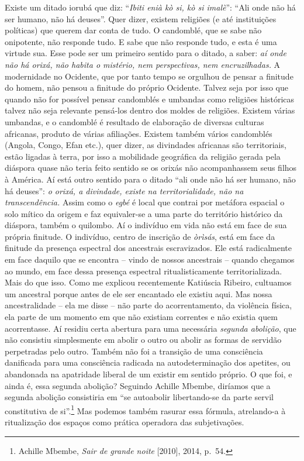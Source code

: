 Existe um ditado iorubá que diz: ``\emph{Ibiti enià kò si, kò si
imalè}'': ``Ali onde não há ser humano, não há deuses''. Quer dizer,
existem religiões (e até instituições políticas) que querem dar conta de
tudo. O candomblé, que se sabe não onipotente, não responde tudo. E sabe
que não responde tudo, e esta é uma virtude sua. Esse pode ser um
primeiro sentido para o ditado, a saber: \emph{aí onde não há orixá, não
habita o mistério, nem perspectivas, nem encruzilhadas.} A modernidade
no Ocidente, que por tanto tempo se orgulhou de pensar a finitude do
homem, não pensou a finitude do próprio Ocidente. Talvez seja por isso
que quando não for possível pensar candomblés e umbandas como religiões
históricas talvez não seja relevante pensá-los dentro dos moldes de
religiões. Existem várias umbandas, e o candomblé é resultado de
elaboração de diversas culturas africanas, produto de várias afiliações.
Existem também vários candomblés (Angola, Congo, Efan etc.), quer dizer,
as divindades africanas são territoriais, estão ligadas à terra, por
isso a mobilidade geográfica da religião gerada pela diáspora quase não
teria feito sentido se os orixás não acompanhassem seus filhos à
América. Aí está outro sentido para o ditado ``ali onde não há ser
humano, não há deuses'': \emph{o orixá, a divindade, existe na
territorialidade, não na transcendência.} Assim como o \emph{egbé} é
local que contrai por metáfora espacial o solo mítico da origem e faz
equivaler-se a uma parte do território histórico da diáspora, também o
quilombo. Aí o indivíduo em vida não está em face de sua própria
finitude. O indivíduo, centro de inscrição de \emph{òrìsás}, está em
face da finitude da presença espectral dos ancestrais escravizados. Ele
está radicalmente em face daquilo que se encontra -- vindo de nossos
ancestrais -- quando chegamos ao mundo, em face dessa presença espectral
ritualisticamente territorializada. Mais do que isso. Como me explicou
recentemente Katiúscia Ribeiro, cultuamos um ancestral porque antes de
ele ser encantado ele existiu aqui. Mas nossa ancestralidade -- ela me
disse -- não parte do acorrentamento, da violência física, ela parte de
um momento em que não existiam correntes e não existia quem
acorrentasse. Aí residiu certa abertura para uma necessária
\emph{segunda abolição}, que não consistiu simplesmente em abolir o
outro ou abolir as formas de servidão perpetradas pelo outro. Também não
foi a transição de uma consciência danificada para uma consciência
radicada na autodeterminação dos apetites, ou abandonada na apatridade
liberal de um existir em sentido próprio. O que foi, e ainda é, essa
segunda abolição? Seguindo Achille Mbembe, diríamos que a segunda
abolição consistiria em ``se autoabolir libertando-se da parte servil
constitutiva de si''.\footnote{Achille Mbembe, \emph{Sair de grande
  noite} {[}2010{]}, 2014, p.~54.} Mas podemos também rasurar essa
fórmula, atrelando-a à ritualização dos espaços como prática operadora
das subjetivações.

